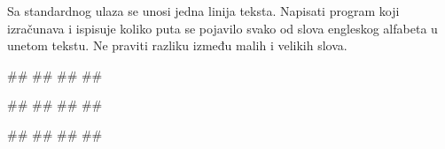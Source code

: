 \begin{Exercise}[label=vp.bez_resenja_3] 
Sa standardnog ulaza se unosi jedna linija teksta. Napisati program koji izračunava i ispisuje koliko puta se pojavilo svako od slova engleskog alfabeta u unetom tekstu. Ne praviti razliku između malih i velikih slova. 


\begin{maxitest}
\begin{upotreba}{1}
#\naslovInt#
##
##
##
\end{upotreba}
\end{maxitest}

\begin{maxitest}
\begin{upotreba}{2}
#\naslovInt#
##
##
##
\end{upotreba}
\end{maxitest}

\begin{maxitest}
\begin{upotreba}{3}
#\naslovInt#
##
##
##
\end{upotreba}
\end{maxitest}
\end{Exercise}
\begin{Answer}[ref=vp.bez_resenja_3]
\end{Answer}

